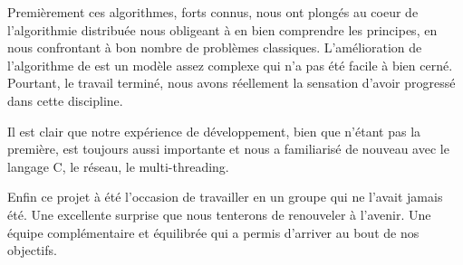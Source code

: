\documentclass[a4paper,12pt]{report}
\begin{document}
Premièrement ces algorithmes, forts connus, nous ont plongés au coeur de l'algorithmie distribuée nous obligeant à en bien comprendre les principes, en nous confrontant à bon nombre de problèmes classiques. L'amélioration de l'algorithme de \nt est un modèle assez complexe qui n'a pas été facile à bien cerné. Pourtant, le travail terminé, nous avons réellement la sensation d'avoir progressé dans cette discipline.

Il est clair que notre expérience de développement, bien que n'étant pas la première, est toujours aussi importante et nous a familiarisé de nouveau avec le langage C, le réseau, le multi-threading.

Enfin ce projet à été l'occasion de travailler en un groupe qui ne l'avait jamais été. Une excellente surprise que nous tenterons de renouveler à l'avenir. Une équipe complémentaire et équilibrée qui a permis d'arriver au bout de nos objectifs.
\end{document}
